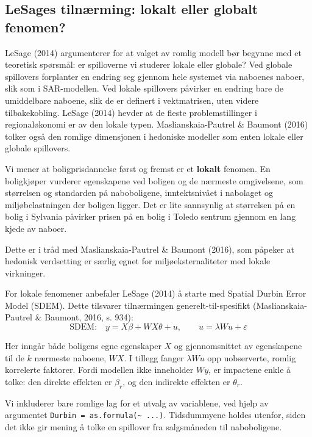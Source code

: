 \documentclass[
  norsk,
  a4paper,
]{article}
\begin{document}
\subsection{LeSages tilnærming: lokalt eller globalt
fenomen?}\label{lesages-tilnuxe6rming-lokalt-eller-globalt-fenomen}

LeSage (2014) argumenterer for at valget av romlig modell bør begynne
med et teoretisk spørsmål: er spilloverne vi studerer lokale eller
globale? Ved globale spillovers forplanter en endring seg gjennom hele
systemet via naboenes naboer, slik som i SAR-modellen. Ved lokale
spillovers påvirker en endring bare de umiddelbare naboene, slik de er
definert i vektmatrisen, uten videre tilbakekobling. LeSage (2014)
hevder at de fleste problemstillinger i regionaløkonomi er av den lokale
typen. Maslianskaia-Pautrel \& Baumont (2016) tolker også den romlige
dimensjonen i hedoniske modeller som enten lokale eller globale
spillovers.

Vi mener at boligprisdannelse først og fremst er et \textbf{lokalt}
fenomen. En boligkjøper vurderer egenskapene ved boligen og de nærmeste
omgivelsene, som størrelsen og standarden på naboboligene,
inntektsnivået i nabolaget og miljøbelastningen der boligen ligger. Det
er lite sannsynlig at størrelsen på en bolig i Sylvania påvirker prisen
på en bolig i Toledo sentrum gjennom en lang kjede av naboer.

Dette er i tråd med Maslianskaia-Pautrel \& Baumont (2016), som påpeker
at hedonisk verdsetting er særlig egnet for miljøeksternaliteter med
lokale virkninger.

For lokale fenomener anbefaler LeSage (2014) å starte med Spatial Durbin
Error Model (SDEM). Dette tilsvarer tilnærmingen generelt-til-spesifikt
(Maslianskaia-Pautrel \& Baumont, 2016, s. 934):
\[\text{SDEM:} \quad y = X\beta + WX\theta + u, \qquad u = \lambda W u + \varepsilon\]

Her inngår både boligens egne egenskaper \(X\) og gjennomsnittet av
egenskapene til de \(k\) nærmeste naboene, \(WX\). I tillegg fanger
\(\lambda Wu\) opp uobserverte, romlig korrelerte faktorer. Fordi
modellen ikke inneholder \(Wy\), er impactene enkle å tolke: den direkte
effekten er \(\beta_r\), og den indirekte effekten er \(\theta_r\).

Vi inkluderer bare romlige lag for et utvalg av variablene, ved hjelp av
argumentet \texttt{Durbin\ =\ as.formula(\textasciitilde{}\ ...)}.
Tidsdummyene holdes utenfor, siden det ikke gir mening å tolke en
spillover fra salgsmåneden til naboboligene.
\end{document}
